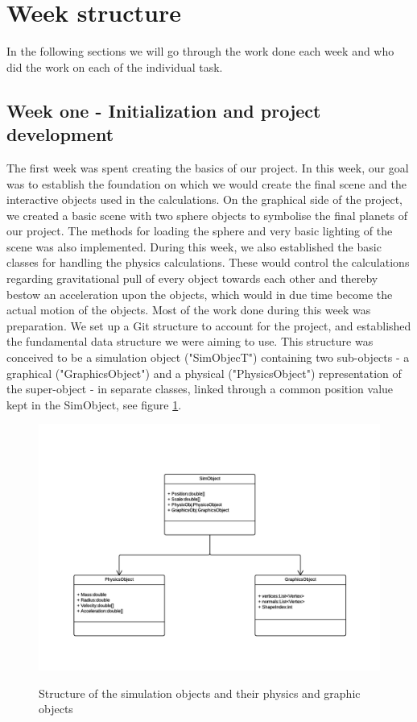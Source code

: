 \section{Week structure}
In the following sections we will go through the work done each week and who did the work on each of the individual task.
\subsection{Week one - Initialization and project development}
The first week was spent creating the basics of our project. In this week, our goal was to establish the foundation on which we would create the final scene and the interactive objects used in the calculations. 
On the graphical side of the project, we created a basic scene with two sphere objects to symbolise the final planets of our project. The methods for loading the sphere and very basic lighting of the scene was also implemented.
During this week, we also established the basic classes for handling the physics calculations. These would control the calculations regarding gravitational pull of every object towards each other and thereby bestow an acceleration upon the objects, which would in due time become the actual motion of the objects.
Most of the work done during this week was preparation. We set up a Git structure to account for the project, and established the fundamental data structure we were aiming to use. This structure was conceived to be a simulation object ("SimObjecT") containing two sub-objects - a graphical ("GraphicsObject") and a physical ("PhysicsObject") representation of the super-object - in separate classes, linked through a common position value kept in the SimObject, see figure \ref{GraphicsObjects}.
\begin{figure}[h]
\centering
\includegraphics[scale=0.7]{GraphicsProjectObjects.png}
\label{GraphicsObjects}
\caption{Structure of the simulation objects and their physics and graphic objects}
\end{figure}
